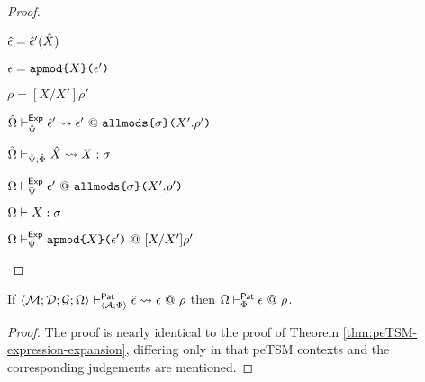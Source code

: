 \begin{proof}
\begin{byCases}
    \begin{pfsteps*}
      \item ${\hat\epsilon}={\hat\epsilon}'({\hat X})$ 
      \item $\epsilon=\texttt{apmod}\texttt{\{}X\texttt{\}(}\epsilon'\texttt{)}$ 
      \item $\rho=[X/X']\rho'$ 
      \item ${\hat\Omega} \vdash_{\hat{\Psi}}^{\mathsf{Exp}} {\hat\epsilon}' \leadsto \epsilon'~@~\texttt{allmods}\texttt{\{}\sigma\texttt{\}(}X'.\rho'\texttt{)}$  
      \item ${\hat\Omega} \vdash_{\hat{\Psi}; \hat\Phi} {\hat X} \leadsto X : \sigma$  
      \item $\Omega \vdash_{\Psi}^{\mathsf{Exp}} \epsilon' ~@~ \texttt{allmods}\texttt{\{}\sigma\texttt{\}(}X'.\rho'\texttt{)}$  
      \item $\Omega \vdash X : \sigma$  
      \item $\Omega \vdash_{\Psi}^{\mathsf{Exp}} \texttt{apmod}\texttt{\{}X\texttt{\}(}\epsilon'\texttt{)} ~@~ [X/X']\rho'$ 
    \end{pfsteps*}
    \resetpfcounter
\end{byCases}

\end{proof}

\begin{theorem}
\label{thm:ppTSM-expression-expansion}
If $\langle \mathcal{M}; \mathcal{D}; \mathcal{G}; \Omega \rangle \vdash_{\langle \mathcal{A}; \Phi \rangle}^{\mathsf{Pat}} {\hat\epsilon} \leadsto \epsilon~@~\rho$ then $\Omega \vdash_{\Phi}^{\mathsf{Pat}} \epsilon ~@~ \rho$.
\end{theorem}
\begin{proof} The proof is nearly identical to the proof of Theorem \ref{thm:peTSM-expression-expansion}, differing only in that peTSM contexts and the corresponding judgements are mentioned. \end{proof}

